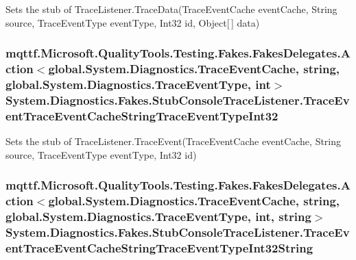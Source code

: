 Sets the stub of Trace\-Listener.\-Trace\-Data(\-Trace\-Event\-Cache event\-Cache, String source, Trace\-Event\-Type event\-Type, Int32 id, Object\mbox{[}$\,$\mbox{]} data)

\hypertarget{class_system_1_1_diagnostics_1_1_fakes_1_1_stub_console_trace_listener_a4c58a8db911521908a32635c65e29b0e}{
\subsubsection[{Trace\-Event\-Trace\-Event\-Cache\-String\-Trace\-Event\-Type\-Int32}]{\setlength{\rightskip}{0pt plus 5cm}mqttf.\-Microsoft.\-Quality\-Tools.\-Testing.\-Fakes.\-Fakes\-Delegates.\-Action$<$global.\-System.\-Diagnostics.\-Trace\-Event\-Cache, string, global.\-System.\-Diagnostics.\-Trace\-Event\-Type, int$>$ System.\-Diagnostics.\-Fakes.\-Stub\-Console\-Trace\-Listener.\-Trace\-Event\-Trace\-Event\-Cache\-String\-Trace\-Event\-Type\-Int32}}\label{class_system_1_1_diagnostics_1_1_fakes_1_1_stub_console_trace_listener_a4c58a8db911521908a32635c65e29b0e}


Sets the stub of Trace\-Listener.\-Trace\-Event(\-Trace\-Event\-Cache event\-Cache, String source, Trace\-Event\-Type event\-Type, Int32 id)

\hypertarget{class_system_1_1_diagnostics_1_1_fakes_1_1_stub_console_trace_listener_a64d9289b80b02e4ed2ef612175b28c04}{
\subsubsection[{Trace\-Event\-Trace\-Event\-Cache\-String\-Trace\-Event\-Type\-Int32\-String}]{\setlength{\rightskip}{0pt plus 5cm}mqttf.\-Microsoft.\-Quality\-Tools.\-Testing.\-Fakes.\-Fakes\-Delegates.\-Action$<$global.\-System.\-Diagnostics.\-Trace\-Event\-Cache, string, global.\-System.\-Diagnostics.\-Trace\-Event\-Type, int, string$>$ System.\-Diagnostics.\-Fakes.\-Stub\-Console\-Trace\-Listener.\-Trace\-Event\-Trace\-Event\-Cache\-String\-Trace\-Event\-Type\-Int32\-String}}\label{class_system_1_1_diagnostics_1_1_fakes_1_1_stub_console_trace_listener_a64d9289b80b02e4ed2ef612175b28c04}


